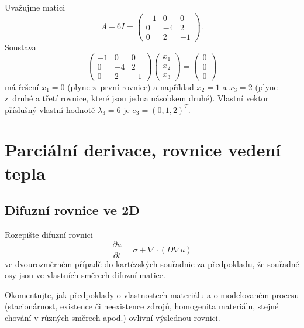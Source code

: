 Uvažujme matici
\begin{equation*}
  A-6 I=
  \begin{pmatrix}
    -1 & 0 & 0\\
    0 & -4 & 2\\
    0 & 2& -1
  \end{pmatrix}.
\end{equation*}
Soustava
\begin{equation*}
  \begin{pmatrix}
    -1 & 0 & 0\\
    0 & -4 & 2\\
    0 & 2& -1
  \end{pmatrix}
  \begin{pmatrix}
    x_1\\x_2\\x_3
  \end{pmatrix}
  =
  \begin{pmatrix}
    0 \\0\\0
  \end{pmatrix}
\end{equation*}
má řešení $x_1=0$ (plyne z první rovnice) a například $x_2=1$ a $x_3=2$ (plyne z druhé a třetí rovnice, které jsou jedna násobkem druhé). Vlastní vektor příslušný vlastní hodnotě $\lambda_3=6$ je $e_3=(0,1,2)^T$.

\konec



\stranka
\section{Parciální derivace, rovnice vedení tepla}


\subsection{Difuzní rovnice ve 2D}

Rozepište difuzní rovnici
$$\frac{\partial u}{\partial t}=\sigma+\nabla\cdot (D\nabla u)$$
ve dvourozměrném případě do kartézských souřadnic za předpokladu, že souřadné osy jsou ve vlastních směrech difuzní matice.

Okomentujte, jak předpoklady o vlastnostech materiálu a o modelovaném procesu (stacionárnost, existence či neexistence zdrojů, homogenita materiálu, stejné chování v různých směrech apod.) ovlivní výslednou rovnici.

